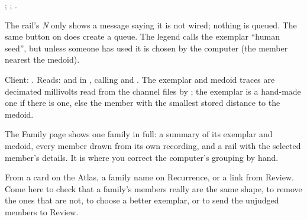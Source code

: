 ; ; .

\begin{watchout}
The rail's  \emph{N}  only shows a message saying it is not
wired; nothing is queued. The same button on  does create a queue.
The legend calls the exemplar ``human seed'', but unless someone has used 
it is chosen by the computer (the member nearest the medoid).
\end{watchout}

\begin{underthehood}[Atlas]
Client: . Reads:  and
 in , calling
 and . The exemplar and medoid traces
are decimated millivolts read from the channel files by ; the
exemplar is a hand-made one if there is one, else the member with the smallest stored
distance to the medoid.
\end{underthehood}

The Family page shows one family in full: a summary of its exemplar and medoid, every member
drawn from its own recording, and a rail with the selected member's details. It is where you
correct the computer's grouping by hand.

From a card on the Atlas, a family name on Recurrence, or a link from Review. Come here to
check that a family's members really are the same shape, to remove the ones that are not, to
choose a better exemplar, or to send the unjudged members to Review.


